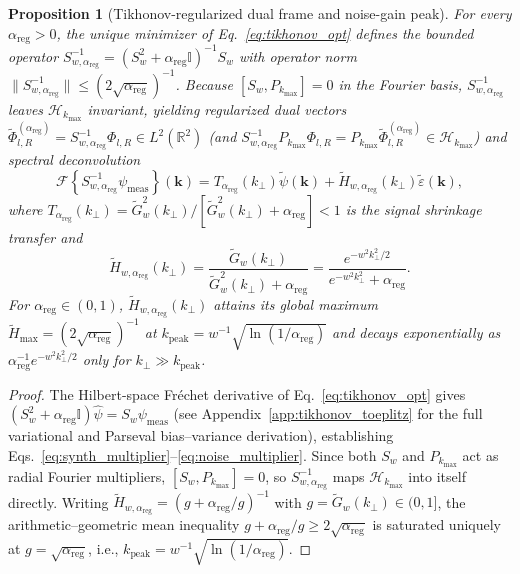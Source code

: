 \documentclass[aps,pra,onecolumn,notitlepage,11pt,tightenlines,nofootinbib,floatfix,longbibliography]{revtex4-2}
\newtheorem{proposition}{Proposition}
\theoremstyle{remark}
\newcommand{\norm}[1]{\lVert #1 \rVert}
\begin{document}
\begin{proposition}[Tikhonov-regularized dual frame and noise-gain peak]
\label{prop:tikhonov_dual}
For every $\alpha_{\mathrm{reg}} > 0$, the unique minimizer of Eq.~\eqref{eq:tikhonov_opt} defines the bounded operator $S_{w,\alpha_{\mathrm{reg}}}^{-1} = (S_w^2 + \alpha_{\mathrm{reg}}\mathbb{I})^{-1}S_w$ with operator norm $\norm{S_{w,\alpha_{\mathrm{reg}}}^{-1}} \le (2\sqrt{\alpha_{\mathrm{reg}}})^{-1}$. Because $[S_w, P_{k_{\max}}] = 0$ in the Fourier basis, $S_{w,\alpha_{\mathrm{reg}}}^{-1}$ leaves $\mathcal{H}_{k_{\max}}$ invariant, yielding regularized dual vectors $\widetilde{\Phi}_{l,R}^{(\alpha_{\mathrm{reg}})} = S_{w,\alpha_{\mathrm{reg}}}^{-1}\Phi_{l,R} \in L^2(\mathbb{R}^2)$ (and $S_{w,\alpha_{\mathrm{reg}}}^{-1}P_{k_{\max}}\Phi_{l,R} = P_{k_{\max}}\widetilde{\Phi}_{l,R}^{(\alpha_{\mathrm{reg}})} \in \mathcal{H}_{k_{\max}}$) and spectral deconvolution
\begin{equation}
\mathcal{F}\!\left\{S_{w,\alpha_{\mathrm{reg}}}^{-1}\psi_{\mathrm{meas}}\right\}(\mathbf{k}) = T_{\alpha_{\mathrm{reg}}}(k_\perp)\widetilde{\psi}(\mathbf{k}) + \widetilde{H}_{w,\alpha_{\mathrm{reg}}}(k_\perp)\widetilde{\varepsilon}(\mathbf{k}),
\label{eq:synth_multiplier}
\end{equation}
where $T_{\alpha_{\mathrm{reg}}}(k_\perp) = \widetilde{G}_w^2(k_\perp)/[\widetilde{G}_w^2(k_\perp) + \alpha_{\mathrm{reg}}] < 1$ is the signal shrinkage transfer and
\begin{equation}
\widetilde{H}_{w,\alpha_{\mathrm{reg}}}(k_\perp) = \frac{\widetilde{G}_w(k_\perp)}{\widetilde{G}_w^2(k_\perp) + \alpha_{\mathrm{reg}}} = \frac{e^{-w^2 k_\perp^2/2}}{e^{-w^2 k_\perp^2} + \alpha_{\mathrm{reg}}}.
\label{eq:noise_multiplier}
\end{equation}
For $\alpha_{\mathrm{reg}} \in (0,1)$, $\widetilde{H}_{w,\alpha_{\mathrm{reg}}}(k_\perp)$ attains its global maximum $\widetilde{H}_{\max} = (2\sqrt{\alpha_{\mathrm{reg}}})^{-1}$ at $k_{\mathrm{peak}} = w^{-1}\sqrt{\ln(1/\alpha_{\mathrm{reg}})}$ and decays exponentially as $\alpha_{\mathrm{reg}}^{-1} e^{-w^2 k_\perp^2/2}$ only for $k_\perp \gg k_{\mathrm{peak}}$.
\end{proposition}
\begin{proof}
The Hilbert-space Fr\'echet derivative of Eq.~\eqref{eq:tikhonov_opt} gives $(S_w^2 + \alpha_{\mathrm{reg}}\mathbb{I})\hat{\psi} = S_w\psi_{\mathrm{meas}}$ (see Appendix~\ref{app:tikhonov_toeplitz} for the full variational and Parseval bias--variance derivation), establishing Eqs.~\eqref{eq:synth_multiplier}--\eqref{eq:noise_multiplier}. Since both $S_w$ and $P_{k_{\max}}$ act as radial Fourier multipliers, $[S_w, P_{k_{\max}}] = 0$, so $S_{w,\alpha_{\mathrm{reg}}}^{-1}$ maps $\mathcal{H}_{k_{\max}}$ into itself directly. Writing $\widetilde{H}_{w,\alpha_{\mathrm{reg}}} = (g + \alpha_{\mathrm{reg}}/g)^{-1}$ with $g = \widetilde{G}_w(k_\perp) \in (0,1]$, the arithmetic--geometric mean inequality $g + \alpha_{\mathrm{reg}}/g \ge 2\sqrt{\alpha_{\mathrm{reg}}}$ is saturated uniquely at $g = \sqrt{\alpha_{\mathrm{reg}}}$, i.e., $k_{\mathrm{peak}} = w^{-1}\sqrt{\ln(1/\alpha_{\mathrm{reg}})}$.
\end{proof}
\end{document}
